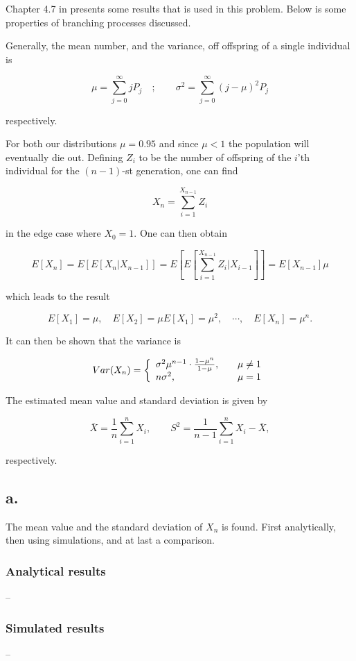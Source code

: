 Chapter 4.7 in \cite{ross} presents some results that is used in this problem. Below is some properties of branching processes discussed.

Generally, the mean number, and the variance, off offspring of a single individual is

\begin{equation}
\mu = \sum_{j=0}^{\infty} jP_j \quad; \quad \quad \sigma^2 = \sum_{j=0}^{\infty} (j-\mu)^2P_j
\end{equation}

respectively.

For both our distributions $\mu = 0.95$ and since $\mu < 1$ the population will eventually die out. Defining $Z_i$ to be the number of offspring of the $i$'th individual for the $(n-1)$-st generation, one can find 

\begin{equation}
X_n = \sum_{i=1}^{X_{n-1}} Z_i
\end{equation}

in the edge case where $X_0=1$. One can then obtain

\begin{equation}
E[X_n] = E[E[X_n | X_{n-1}]] = E\left[ E\left[ \sum_{i=1}^{X_{n-1}} Z_i | X_{i-1} \right] \right] = E[X_{n-1}] \mu 
\end{equation}

which leads to the result

\begin{equation}
E[X_1] = \mu, \quad E[X_2] = \mu E[X_1] = \mu^2, \quad \cdots, \quad E[X_n] = \mu^n.
\end{equation}

It can then be shown that the variance is

\begin{align}
\label{variance}
  Var(X_n) = \left\{ 
  \begin{array}{l l l}
     \sigma^2 \mu^{n-1} \cdot \frac{1-\mu^n}{1-\mu}, \quad &\mu \neq 1\\
     n \sigma^2, \quad  &\mu = 1 \\
  \end{array} \right.
\end{align}

The estimated mean value and standard deviation is given by

\begin{equation}
\bar{X} = \frac{1}{n} \sum_{i=1}^{n} X_i, \qquad S^2 = \frac{1}{n-1}\sum_{i=1}^{n} X_i - \bar{X},
\end{equation}

respectively. 

\subsection*{a.}
The mean value and the standard deviation of $X_n$ is found. First analytically, then using simulations, and at last a comparison.

\subsubsection{Analytical results}
--

\subsubsection{Simulated results}
--

